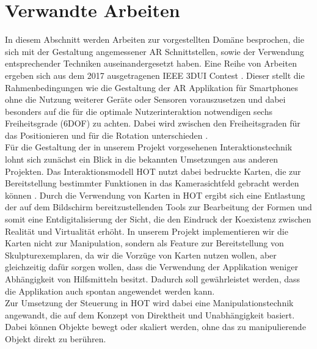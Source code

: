 \documentclass[12pt,a4paper, oneside]{scrartcl}
\begin{document}



\newpage




\section{Verwandte Arbeiten}
In diesem Abschnitt werden Arbeiten zur vorgestellten Domäne besprochen, die sich mit der Gestaltung angemessener AR Schnittstellen, sowie der Verwendung entsprechender Techniken auseinandergesetzt haben.
Eine Reihe von Arbeiten ergeben sich aus dem 2017 ausgetragenen IEEE 3DUI Contest \cite{guo_mcmahan_weyers_2017}. Dieser stellt die Rahmenbedingungen wie die Gestaltung der AR Applikation für Smartphones ohne die Nutzung weiterer Geräte oder Sensoren vorauszusetzen und dabei besonders auf die für die optimale Nutzerinteraktion notwendigen sechs Freiheitsgrade  (6DOF) zu achten. Dabei wird zwischen den Freiheitsgraden für das Positionieren und für die Rotation unterschieden \cite{guo_mcmahan_weyers_2017}. \\
Für die Gestaltung der in unserem Projekt vorgesehenen Interaktionstechnik lohnt sich zunächst ein Blick in die bekannten Umsetzungen aus anderen Projekten.
Das Interaktionsmodell HOT nutzt dabei bedruckte Karten, die zur Bereitstellung bestimmter Funktionen in das Kamerasichtfeld gebracht werden können \cite{attanasio_2017}. 
Durch die Verwendung von Karten in HOT ergibt sich eine Entlastung der auf dem Bildschirm bereitzustellenden Tools zur Bearbeitung der Formen und somit eine Entdigitalisierung der Sicht, die den Eindruck der Koexistenz zwischen Realität und Virtualität erhöht.
In unserem Projekt implementieren wir die Karten nicht zur Manipulation, sondern als Feature zur Bereitstellung von Skulpturexemplaren, da wir die Vorzüge von Karten nutzen wollen, aber gleichzeitig dafür sorgen wollen, dass die Verwendung der Applikation weniger Abhängigkeit von Hilfsmitteln besitzt. Dadurch soll gewährleistet werden, dass die Applikation auch spontan angewendet werden kann. \\
Zur Umsetzung der Steuerung in HOT wird dabei eine Manipulationstechnik angewandt, die auf dem Konzept von Direktheit und Unabhängigkeit basiert. Dabei können Objekte bewegt oder skaliert werden, ohne das zu manipulierende Objekt direkt zu berühren.
\end{document}

